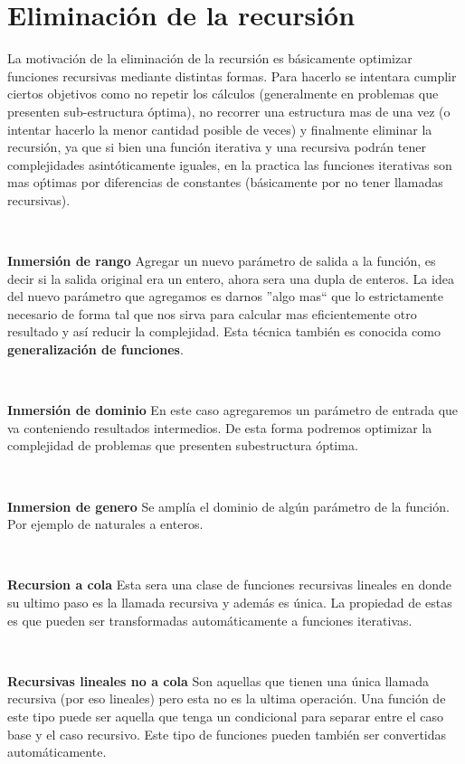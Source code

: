 \section{Eliminaci\'on de la recursi\'on}

La motivaci\'on de la eliminaci\'on de la recursi\'on es b\'asicamente optimizar funciones recursivas mediante distintas formas. Para hacerlo se intentara cumplir ciertos objetivos como no repetir los c\'alculos (generalmente en problemas que presenten sub-estructura \'optima), no recorrer una estructura mas de una vez (o intentar hacerlo la menor cantidad posible de veces) y finalmente eliminar la recursi\'on, ya que si bien una funci\'on iterativa y una recursiva podr\'an tener complejidades asint\'oticamente iguales, en la practica las funciones iterativas son mas o\'ptimas por diferencias de constantes (b\'asicamente por no tener llamadas recursivas).

~

\textbf{Inmersi\'on de rango} Agregar un nuevo par\'ametro de salida a la funci\'on, es decir si la salida original era un entero, ahora sera una dupla de enteros. La idea del nuevo par\'ametro que agregamos es darnos ''algo mas`` que lo estrictamente necesario de forma tal que nos sirva para calcular mas eficientemente otro resultado y as\'i reducir la complejidad. Esta t\'ecnica tambi\'en es conocida como \textbf{generalizaci\'on de funciones}.

~

\textbf{Inmersi\'on de dominio} En este caso agregaremos un par\'ametro de entrada que va conteniendo resultados intermedios. De esta forma podremos optimizar la complejidad de problemas que presenten subestructura \'optima.

~

\textbf{Inmersion de genero} Se ampl\'ia el dominio de alg\'un par\'ametro de la funci\'on. Por ejemplo de naturales a enteros.

~

\textbf{Recursion a cola} Esta sera una clase de funciones recursivas lineales en donde su ultimo paso es la llamada recursiva y adem\'as es \'unica. La propiedad de estas es que pueden ser transformadas autom\'aticamente a funciones iterativas.

~

\textbf{Recursivas lineales no a cola} Son aquellas que tienen una \'unica llamada recursiva (por eso lineales) pero esta no es la ultima operaci\'on. Una funci\'on de este tipo puede ser aquella que tenga un condicional para separar entre el caso base y el caso recursivo. Este tipo de funciones pueden tambi\'en ser convertidas autom\'aticamente.

